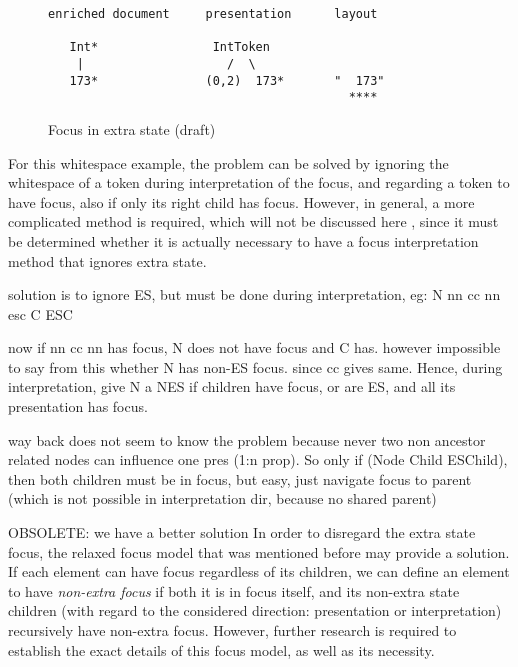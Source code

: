 \begin{figure}
\begin{small}
\begin{center}
\begin{verbatim}
enriched document     presentation      layout

   Int*                IntToken     
    |                    /  \    
   173*               (0,2)  173*       "  173"
                                          ****
\end{verbatim}
\caption{Focus in extra state (draft)}\label{extraStateFocusunpresentableFocus} 
\end{center}
\end{small}
\end{figure}

For this whitespace example, the problem can be solved by ignoring the whitespace of a token during interpretation of the focus, and regarding a token to have focus, also if only its right child has focus. However, in general, a more complicated method is required, which will not be discussed here , since it must be determined whether it is actually necessary to have a focus interpretation method that ignores extra state. 

\bc
solution is to ignore ES, but must be done during interpretation, eg:
  N       nn cc nn esc
C ESC 

now if nn cc nn has focus, N does not have focus and C has. however impossible to say from this whether N has non-ES focus. since cc gives same. Hence, during interpretation, give N a NES if children have focus, or are ES, and all its presentation has focus.
\ec

\bc
way back does not seem to know the problem because never two non ancestor related nodes can influence one pres (1:n prop). So only if (Node Child ESChild), then both children must be in focus, but easy, just navigate focus to parent (which is not possible in interpretation dir, because no shared parent)
\ec

\bc OBSOLETE: we have a better solution
In order to disregard the extra state focus, the relaxed focus model that was mentioned before may provide a solution. If each element can have focus regardless of its children, we can define an element to have {\em non-extra focus} if both it is in focus itself, and its non-extra state children (with regard to the considered direction: presentation or interpretation) recursively have non-extra focus. However, further research is required to establish the exact details of this focus model, as well as its necessity.
\ec

